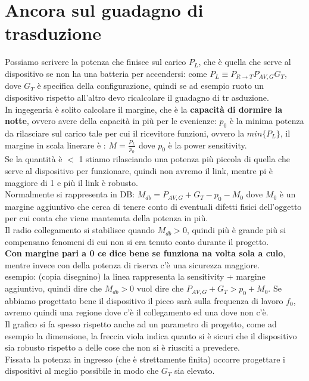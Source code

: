 \documentclass[oneside, 12pt]{extbook}
\begin{document}
\section{Ancora sul guadagno di trasduzione}
Possiamo scrivere la potenza che finisce sul carico $P_L$, che è quella che serve al dispositivo se non ha una batteria per accendersi: come $P_L \equiv P_{R\rightarrow T} P_{AV,G} G_T$, dove $G_T$ è specifica della configurazione, quindi se ad esempio ruoto un dispositivo rispetto all'altro devo ricalcolare il guadagno di tr asduzione.\\In ingegenria è solito calcolare il margine, che è la \textbf{capacità di dormire la notte}, ovvero avere della capacità in più per le evenienze: $p_0$ è la minima potenza da rilasciare sul carico tale per cui il ricevitore funzioni, ovvero la $min\{P_L\}$, il margine in scala linerare è : $M = \frac{P_L}{p_0}$ dove $p_0$ è la power sensitivity.\\Se la quantità è $<$ 1 stiamo rilasciando una potenza più piccola di quella che serve al dispositivo per funzionare, quindi non avremo il link, mentre pi è maggiore di 1 e più il link è robusto.\\Normalmente si rappresenta in DB: $M_{db} = P_{AV,G} + G_T -p_0 - M_0$ dove $M_0$ è un margine aggiuntivo che cerca di tenere conto di eventuali difetti fisici dell'oggetto per cui conta che viene mantenuta della potenza in più.\\Il radio collegamento si stabilisce quando $M_{db} > 0$, quindi più è grande più si compensano fenomeni di cui non si era tenuto conto durante il progetto.\\\textbf{Con margine pari a 0 ce dice bene se funziona na volta sola a culo}, mentre invece con della potenza di riserva c'è una sicurezza maggiore.\\esempio: (copia disegnino) la linea rappresenta la sensitivity + margine aggiuntivo, quindi dire che $M_{db} > 0$ vuol dire che $P_{AV,G} + G_T > p_0 + M_0$. Se abbiamo progettato bene il dispositivo il picco sarà sulla frequenza di lavoro $f_0$, avremo quindi una regione dove c'è il collegamento ed una dove non c'è.\\Il grafico si fa spesso rispetto anche ad un parametro di progetto, come ad esempio la dimensione, la freccia viola indica quanto si è sicuri che il dispositivo sia robusto rispetto a delle cose che non si è riusciti a prevedere.\\Fissata la potenza in ingresso (che è strettamente finita) occorre progettare i dispositivi al meglio possibile in modo che $G_T$ sia elevato.
\end{document}
